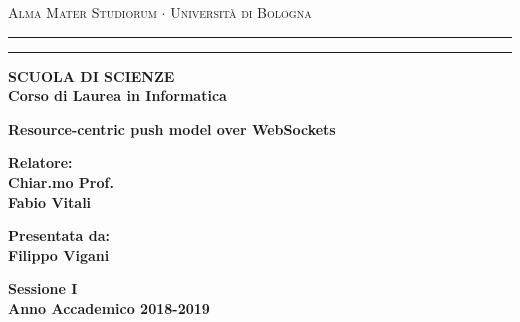 \documentclass[12pt,a4paper,openright]{report}
\begin{document}
\begin{titlepage}
\begin{center}
{{\Large{\textsc{Alma Mater Studiorum $\cdot$ Universit\`a di
Bologna}}}} \rule[0.1cm]{15.8cm}{0.1mm}
\rule[0.5cm]{15.8cm}{0.6mm}
{\small{\bf SCUOLA DI SCIENZE\\
  Corso di Laurea in Informatica }}
  \end{center}
  \vspace{40mm}
  \begin{center}
  {\LARGE{\bf Resource-centric push model over WebSockets}}\\
  \end{center}
  \vspace{40mm}
  \par
  \noindent
  \begin{minipage}[t]{0.47\textwidth}
  {\large{\bf Relatore:\\
  Chiar.mo Prof.\\
  Fabio Vitali}}
  \end{minipage}
  \hfill
  \begin{minipage}[t]{0.47\textwidth}\raggedleft
  {\large{\bf Presentata da:\\
  Filippo Vigani}}
  \end{minipage}
  \vspace{30mm}
  \begin{center}
  {\large{\bf Sessione I\\%
  Anno Accademico 2018-2019}}%
  \end{center}
  \end{titlepage}


  \cleardoublepage

  \cleardoublepage
  \thispagestyle{empty}
  \large                                  %
  \begin{flushright}
  \em
  \itshape

  \end{flushright}
  \cleardoublepage
\end{document}
